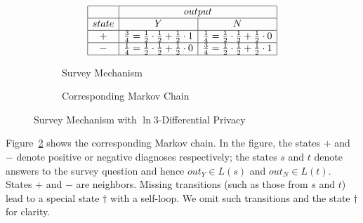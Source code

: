 \begin{figure}
  \centering
  \begin{subfigure}{.48\columnwidth}
      \[
      \begin{array}{|c|c|c|}
        \hline
        &
        \multicolumn{2}{c|}{output}
        \\
        \hline
        state & Y & N \\
        \hline
        + & \frac{3}{4} = \frac{1}{2} \cdot \frac{1}{2} + \frac{1}{2} \cdot 1
          & \frac{1}{4} = \frac{1}{2} \cdot \frac{1}{2} + \frac{1}{2} \cdot 0
        \\
        \hline
        - & \frac{1}{4} = \frac{1}{2} \cdot \frac{1}{2} + \frac{1}{2} \cdot 0
          & \frac{3}{4} = \frac{1}{2} \cdot \frac{1}{2} + \frac{1}{2} \cdot 1
        \\
        \hline
      \end{array}
      \]
    \caption{Survey Mechanism}
    \label{figure:2-dp-table}
  \end{subfigure}
  \hspace{.05\columnwidth}
  \begin{subfigure}{.40\columnwidth}
    \caption{Corresponding Markov Chain}
    \label{figure:2-dp-mdp}
  \end{subfigure}
  \caption{Survey Mechanism with $\ln 3$-Differential Privacy}
  \label{figure:2-dp}
\end{figure}

Figure~\ref{figure:2-dp-mdp} shows the corresponding Markov chain.
In the figure, the states
$+$ and $-$ denote positive or negative diagnoses 
respectively; the states $s$ and $t$ denote answers to the survey
question and hence $\mathit{out}_Y \in L (s)$ and $\mathit{out}_N
\in L (t)$.
States $+$ and $-$ are neighbors.
Missing transitions (such as those from $s$ and $t$) lead
to a special state $\dagger$ with a self-loop. We omit such transitions
and the state $\dagger$ for clarity.


